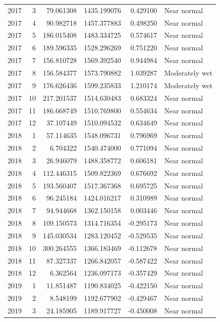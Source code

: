 \begin{tabular}{rrrrrl}
2017 & 3 & 79.061308 & 1435.199076 & 0.429100 & Near normal \\
2017 & 4 & 90.982718 & 1457.377883 & 0.498250 & Near normal \\
2017 & 5 & 186.015408 & 1483.334725 & 0.574617 & Near normal \\
2017 & 6 & 189.596335 & 1528.296269 & 0.751220 & Near normal \\
2017 & 7 & 156.810728 & 1569.392540 & 0.944984 & Near normal \\
2017 & 8 & 156.584377 & 1573.790882 & 1.039287 & Moderately wet \\
2017 & 9 & 176.626436 & 1599.235833 & 1.210174 & Moderately wet \\
2017 & 10 & 217.201537 & 1514.630483 & 0.683324 & Near normal \\
2017 & 11 & 186.668749 & 1510.769800 & 0.554634 & Near normal \\
2017 & 12 & 37.107449 & 1510.094532 & 0.634649 & Near normal \\
2018 & 1 & 57.114635 & 1548.096731 & 0.796969 & Near normal \\
2018 & 2 & 6.704322 & 1540.474000 & 0.771094 & Near normal \\
2018 & 3 & 26.946079 & 1488.358772 & 0.606181 & Near normal \\
2018 & 4 & 112.446315 & 1509.822369 & 0.676692 & Near normal \\
2018 & 5 & 193.560407 & 1517.367368 & 0.695725 & Near normal \\
2018 & 6 & 96.245184 & 1424.016217 & 0.310989 & Near normal \\
2018 & 7 & 94.944668 & 1362.150158 & 0.003446 & Near normal \\
2018 & 8 & 109.150573 & 1314.716354 & -0.295173 & Near normal \\
2018 & 9 & 145.030534 & 1283.120452 & -0.529535 & Near normal \\
2018 & 10 & 300.264555 & 1366.183469 & -0.112678 & Near normal \\
2018 & 11 & 87.327337 & 1266.842057 & -0.587422 & Near normal \\
2018 & 12 & 6.362564 & 1236.097173 & -0.357429 & Near normal \\
2019 & 1 & 11.851487 & 1190.834025 & -0.422150 & Near normal \\
2019 & 2 & 8.548199 & 1192.677902 & -0.429467 & Near normal \\
2019 & 3 & 24.185905 & 1189.917727 & -0.450008 & Near normal \\

\end{tabular}
